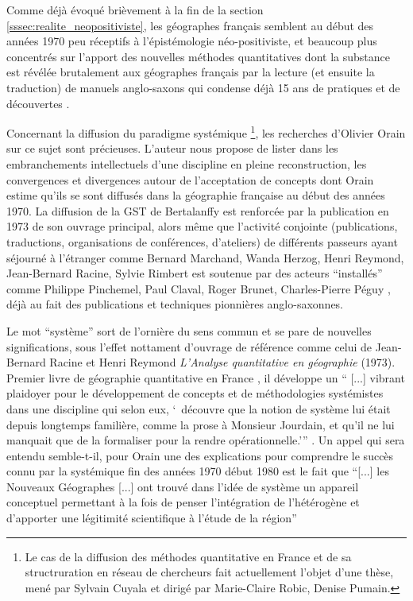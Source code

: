 
Comme déjà évoqué brièvement à la fin de la section \ref{sssec:realite_neopositiviste}, les géographes français semblent au début des années 1970 peu réceptifs à l'épistémologie néo-positiviste, et beaucoup plus concentrés sur l'apport des nouvelles méthodes quantitatives dont la substance est révélée brutalement aux géographes français par la lecture (et ensuite la traduction) de manuels anglo-saxons qui condense déjà 15 ans de pratiques et de découvertes \autocite[129]{Pumain2002}.

Concernant la diffusion du paradigme systémique \footnote{Le cas de la diffusion des méthodes quantitative en France et de sa structruration en réseau de chercheurs fait actuellement l'objet d'une thèse, mené par Sylvain Cuyala et dirigé par Marie-Claire Robic, Denise Pumain.}, les recherches d'Olivier Orain \autocite{Orain2001} sur ce sujet sont précieuses. L'auteur nous propose de lister dans les embranchements intellectuels d'une discipline en pleine reconstruction, les convergences et divergences autour de l'acceptation de concepts dont Orain estime qu'ils se sont diffusés dans la géographie française au début des années 1970. La diffusion de la GST de Bertalanffy est renforcée par la publication en 1973 de son ouvrage principal, alors même que l'activité conjointe (publications, traductions, organisations de conférences, d'ateliers) de différents passeurs ayant séjourné à l'étranger comme Bernard Marchand, Wanda Herzog, Henri Reymond, Jean-Bernard Racine, Sylvie Rimbert est soutenue par des acteurs \enquote{installés} comme Philippe Pinchemel, Paul Claval, Roger Brunet, Charles-Pierre Péguy \autocite{Pumain2002,Cauvin2007}, déjà au fait des publications et techniques pionnières anglo-saxonnes. 

Le mot \enquote{système} sort de l'ornière du sens commun et se pare de nouvelles significations, sous l'effet nottament d'ouvrage de référence comme celui de Jean-Bernard Racine et Henri Reymond  \textit{L’Analyse quantitative en géographie} (1973). Premier livre de géographie quantitative en France \autocite{Cauvin2007}, il développe un \enquote{ [...] vibrant plaidoyer pour le développement de concepts et de méthodologies systémistes dans une discipline qui selon eux, \enquote{ découvre que la notion de système lui était depuis longtemps familière, comme la prose à Monsieur Jourdain, et qu'il ne lui manquait que de la formaliser pour la rendre opérationnelle.}} \textcite{Orain2001}. Un appel qui sera entendu semble-t-il, pour Orain \autocite[23]{Orain2001} une des explications pour comprendre le succès connu par la systémique fin des années 1970 début 1980 est le fait que \enquote{[...] les Nouveaux Géographes [...] ont trouvé dans l’idée de système un appareil conceptuel permettant à la fois de penser l’intégration de l’hétérogène et d’apporter une légitimité scientifique à l’étude de la région} 

